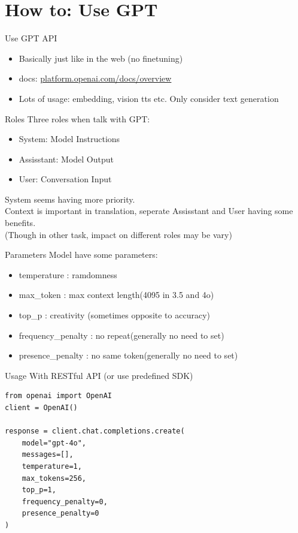 \documentclass{beamer}
\begin{document}
\section{How to: Use GPT}

\begin{frame}{Use GPT API}
    \begin{itemize}
        \item Basically just like in the web (no finetuning)
        \item docs: \url{platform.openai.com/docs/overview}
        \item Lots of usage: embedding, vision tts etc.
        \newline Only consider text generation
    \end{itemize}
\end{frame}

\begin{frame}{Roles}
    Three roles when talk with GPT:
    \begin{itemize}
        \item System: Model Instructions
        \item Assisstant: Model Output
        \item User: Conversation Input
    \end{itemize}
    System seems having more priority. \\
    Context is important in translation, seperate Assisstant and User having some benefits. \\
    \bigskip
    (Though in other task, impact on different roles may be vary)
\end{frame}

\begin{frame}{Parameters}
    Model have some parameters:
    \begin{itemize}
        \item temperature : ramdomness
        \item max\_token : max context length(4095 in 3.5 and 4o)
        \item top\_p : creativity (sometimes opposite to accuracy)
        \item frequency\_penalty : no repeat(generally no need to set)
        \item presence\_penalty : no same token(generally no need to set)
    \end{itemize}
\end{frame}

\begin{frame}[fragile]{Usage}
    With RESTful API (or use predefined SDK)
    \begin{verbatim}
from openai import OpenAI
client = OpenAI()

response = client.chat.completions.create(
    model="gpt-4o",
    messages=[],
    temperature=1,
    max_tokens=256,
    top_p=1,
    frequency_penalty=0,
    presence_penalty=0
)
    \end{verbatim}
\end{frame}
\end{document}
